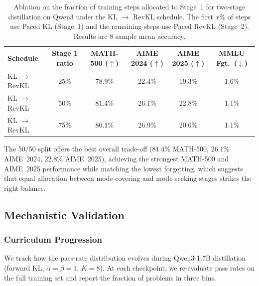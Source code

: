 \documentclass{article}
\newcommand{\mstd}[2]{#1\if\relax\detokenize{#2}\relax\else{$\scriptstyle\,\pm\,#2$}\fi\%}
\begin{document}
\begin{table}[h]
\caption{Ablation on the fraction of training steps allocated to Stage~1 for two-stage distillation on Qwen3 under the KL $\rightarrow$ RevKL schedule. The first $x$\% of steps use Paced KL (Stage~1) and the remaining steps use Paced RevKL (Stage~2). Results are 8-sample mean accuracy.}
\centering
\small
\setlength{\tabcolsep}{4pt}
\begin{tabular}{lc|cccc}
\toprule
\textbf{Schedule} & \textbf{Stage 1 ratio} & MATH-500 ($\uparrow$) & AIME 2024 ($\uparrow$) & AIME 2025 ($\uparrow$) & MMLU Fgt.\ ($\downarrow$) \\
\midrule
KL $\rightarrow$ RevKL & 25\% & \mstd{78.9}{} & \mstd{22.4}{} & \mstd{19.3}{} & 1.6\% \\
KL $\rightarrow$ RevKL & 50\% & \mstd{81.4}{} & \mstd{26.1}{} & \mstd{22.8}{} & 1.1\% \\
KL $\rightarrow$ RevKL & 75\% & \mstd{80.1}{} & \mstd{26.9}{} & \mstd{20.6}{} & 1.1\% \\
\bottomrule
\end{tabular}
\label{tab:twostage_stage1_budget}
\end{table}
The 50/50 split offers the best overall trade-off ($81.4\%$ MATH-500, $26.1\%$ AIME~2024, $22.8\%$ AIME~2025), achieving the strongest MATH-500 and AIME~2025 performance while matching the lowest forgetting, which suggests that equal allocation between mode-covering and mode-seeking stages strikes the right balance.

\subsection{Mechanistic Validation}

\subsubsection{Curriculum Progression}

\label{app:curriculum}
We track how the pass-rate distribution evolves during Qwen3-1.7B distillation (forward KL, $\alpha{=}\beta{=}1$, $K{=}8$). At each checkpoint, we re-evaluate pass rates on the full training set and report the fraction of problems in three bins.
\end{document}
